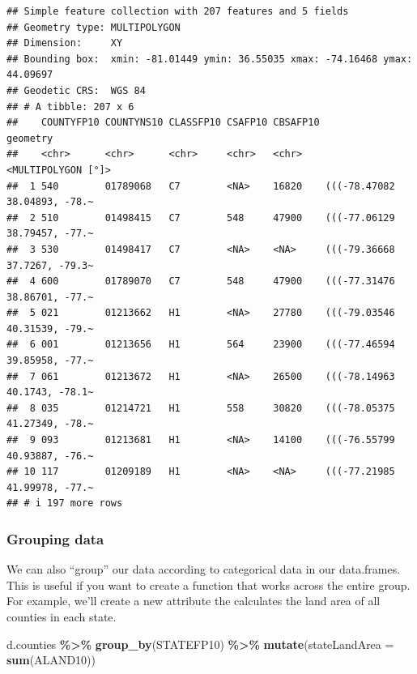 \documentclass[]{article}
\newenvironment{Shaded}{\begin{snugshade}}{\end{snugshade}}
\newcommand{\AttributeTok}[1]{\textcolor[rgb]{0.13,0.29,0.53}{#1}}
\newcommand{\FunctionTok}[1]{\textcolor[rgb]{0.13,0.29,0.53}{\textbf{#1}}}
\newcommand{\NormalTok}[1]{#1}
\newcommand{\SpecialCharTok}[1]{\textcolor[rgb]{0.81,0.36,0.00}{\textbf{#1}}}
\begin{document}
\begin{verbatim}
## Simple feature collection with 207 features and 5 fields
## Geometry type: MULTIPOLYGON
## Dimension:     XY
## Bounding box:  xmin: -81.01449 ymin: 36.55035 xmax: -74.16468 ymax: 44.09697
## Geodetic CRS:  WGS 84
## # A tibble: 207 x 6
##    COUNTYFP10 COUNTYNS10 CLASSFP10 CSAFP10 CBSAFP10                     geometry
##    <chr>      <chr>      <chr>     <chr>   <chr>              <MULTIPOLYGON [°]>
##  1 540        01789068   C7        <NA>    16820    (((-78.47082 38.04893, -78.~
##  2 510        01498415   C7        548     47900    (((-77.06129 38.79457, -77.~
##  3 530        01498417   C7        <NA>    <NA>     (((-79.36668 37.7267, -79.3~
##  4 600        01789070   C7        548     47900    (((-77.31476 38.86701, -77.~
##  5 021        01213662   H1        <NA>    27780    (((-79.03546 40.31539, -79.~
##  6 001        01213656   H1        564     23900    (((-77.46594 39.85958, -77.~
##  7 061        01213672   H1        <NA>    26500    (((-78.14963 40.1743, -78.1~
##  8 035        01214721   H1        558     30820    (((-78.05375 41.27349, -78.~
##  9 093        01213681   H1        <NA>    14100    (((-76.55799 40.93887, -76.~
## 10 117        01209189   H1        <NA>    <NA>     (((-77.21985 41.99978, -77.~
## # i 197 more rows
\end{verbatim}

\subsubsection{Grouping data}\label{grouping-data}

We can also ``group'' our data according to categorical data in our
data.frames. This is useful if you want to create a function that works
across the entire group. For example, we'll create a new attribute the
calculates the land area of all counties in each state.

\begin{Shaded}
\begin{Highlighting}[]
\NormalTok{d.counties }\SpecialCharTok{\%\textgreater{}\%} \FunctionTok{group\_by}\NormalTok{(STATEFP10) }\SpecialCharTok{\%\textgreater{}\%} \FunctionTok{mutate}\NormalTok{(}\AttributeTok{stateLandArea =} \FunctionTok{sum}\NormalTok{(ALAND10))}
\end{Highlighting}
\end{Shaded}
\end{document}
